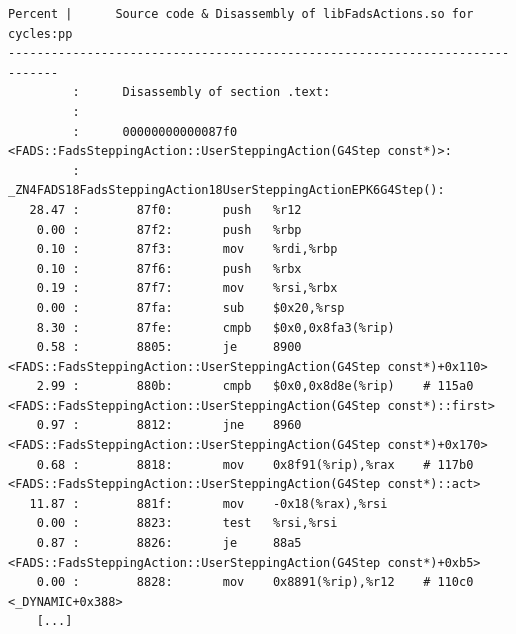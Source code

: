 \documentclass[a4paper]{jpconf}
\begin{document}
\begin{appendices}
\begin{minipage}{\linewidth}
\begin{lstlisting}[language={[x64]Assembler}, basicstyle=\ttfamily\tiny, 
caption=FADS::FadsSteppingAction::UserSteppingAction cycles annotation]
Percent |      Source code & Disassembly of libFadsActions.so for  cycles:pp
-----------------------------------------------------------------------------
         :      Disassembly of section .text:
         :
         :      00000000000087f0 <FADS::FadsSteppingAction::UserSteppingAction(G4Step const*)>:
         :      _ZN4FADS18FadsSteppingAction18UserSteppingActionEPK6G4Step():
   28.47 :        87f0:       push   %r12
    0.00 :        87f2:       push   %rbp
    0.10 :        87f3:       mov    %rdi,%rbp
    0.10 :        87f6:       push   %rbx
    0.19 :        87f7:       mov    %rsi,%rbx
    0.00 :        87fa:       sub    $0x20,%rsp
    8.30 :        87fe:       cmpb   $0x0,0x8fa3(%rip)    
    0.58 :        8805:       je     8900 <FADS::FadsSteppingAction::UserSteppingAction(G4Step const*)+0x110>
    2.99 :        880b:       cmpb   $0x0,0x8d8e(%rip)    # 115a0 <FADS::FadsSteppingAction::UserSteppingAction(G4Step const*)::first>
    0.97 :        8812:       jne    8960 <FADS::FadsSteppingAction::UserSteppingAction(G4Step const*)+0x170>
    0.68 :        8818:       mov    0x8f91(%rip),%rax    # 117b0 <FADS::FadsSteppingAction::UserSteppingAction(G4Step const*)::act>
   11.87 :        881f:       mov    -0x18(%rax),%rsi
    0.00 :        8823:       test   %rsi,%rsi
    0.87 :        8826:       je     88a5 <FADS::FadsSteppingAction::UserSteppingAction(G4Step const*)+0xb5>
    0.00 :        8828:       mov    0x8891(%rip),%r12    # 110c0 <_DYNAMIC+0x388>
    [...]
\end{lstlisting}
\end{minipage}


\end{appendices}
\end{document}
